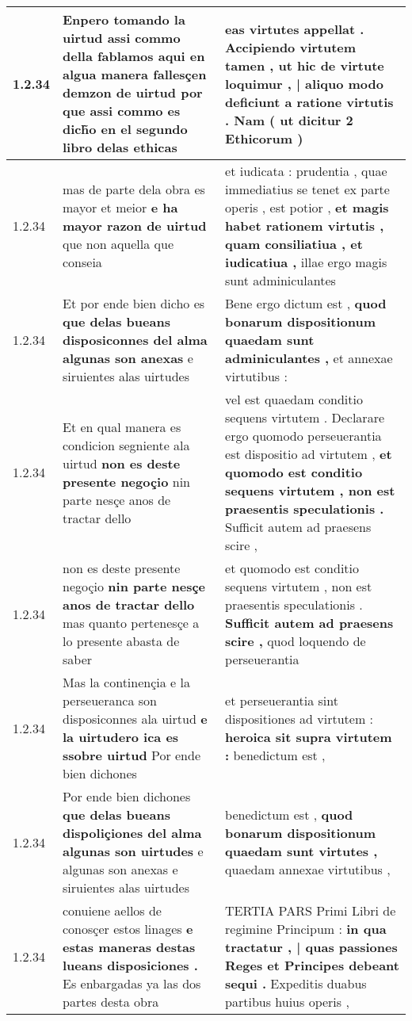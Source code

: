 \begin{tabular}{|p{1cm}|p{6.5cm}|p{6.5cm}|}
1.2.34 & Enpero tomando la uirtud \textbf{ assi commo della fablamos aqui en algua manera fallesçen demzon de uirtud } por que assi commo es dich̃o en el segundo libro delas ethicas & eas virtutes appellat . Accipiendo virtutem tamen , \textbf{ ut hic de virtute loquimur , | aliquo modo deficiunt a ratione virtutis . } Nam ( ut dicitur 2 Ethicorum ) \\\hline
1.2.34 & mas de parte dela obra es mayor et meior \textbf{ e ha mayor razon de uirtud } que non aquella que conseia & et iudicata : prudentia , quae immediatius se tenet ex parte operis , est potior , \textbf{ et magis habet rationem virtutis , quam consiliatiua , et iudicatiua , } illae ergo magis sunt adminiculantes \\\hline
1.2.34 & Et por ende bien dicho es \textbf{ que delas bueans disposiconnes del alma algunas son anexas } e siruientes alas uirtudes & Bene ergo dictum est , \textbf{ quod bonarum dispositionum quaedam sunt adminiculantes , } et annexae virtutibus : \\\hline
1.2.34 & Et en qual manera es condicion segniente ala uirtud \textbf{ non es deste presente negoçio } nin parte nesçe anos de tractar dello & vel est quaedam conditio sequens virtutem . Declarare ergo quomodo perseuerantia est dispositio ad virtutem , \textbf{ et quomodo est conditio sequens virtutem , non est praesentis speculationis . } Sufficit autem ad praesens scire , \\\hline
1.2.34 & non es deste presente negoçio \textbf{ nin parte nesçe anos de tractar dello } mas quanto pertenesçe a lo presente abasta de saber & et quomodo est conditio sequens virtutem , non est praesentis speculationis . \textbf{ Sufficit autem ad praesens scire , } quod loquendo de perseuerantia \\\hline
1.2.34 & Mas la continençia e la perseueranca son disposiconnes ala uirtud \textbf{ e la uirtudero ica es ssobre uirtud } Por ende bien dichones & et perseuerantia sint dispositiones ad virtutem : \textbf{ heroica sit supra virtutem : } benedictum est , \\\hline
1.2.34 & Por ende bien dichones \textbf{ que delas bueans dispoliçiones del alma algunas son uirtudes } e algunas son anexas e siruientes alas uirtudes & benedictum est , \textbf{ quod bonarum dispositionum quaedam sunt virtutes , } quaedam annexae virtutibus , \\\hline
1.2.34 & conuiene aellos de conosçer estos linages \textbf{ e estas maneras destas lueans disposiciones . } Es enbargadas ya las dos partes desta obra & TERTIA PARS Primi Libri de regimine Principum : \textbf{ in qua tractatur , | quas passiones Reges et Principes debeant sequi . } Expeditis duabus partibus huius operis , \\\hline

\end{tabular}
